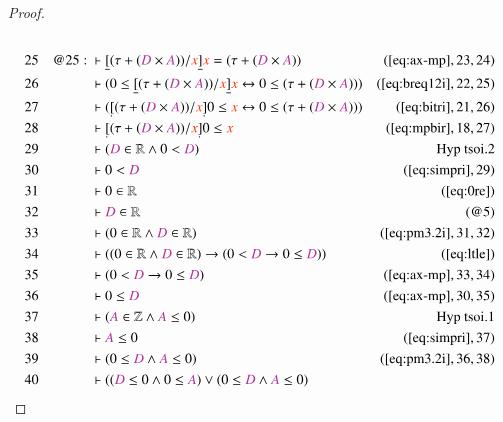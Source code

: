 \begin{proof}
\begin{align}
  \\ 25 && @25:\  & \vdash \underline{[} ( \tau + ( \mc{D} \times \mc{A} ) ) /
      \msc{x} \underline{]} \msc{x} = ( \tau + ( \mc{D}
      \times \mc{A} ) )&(\mbox{\ref{eq:ax-mp}},23,24)\notag
  \\ 26 &&  & \vdash ( 0 \le \underline{[} ( \tau + ( \mc{D} \times \mc{A} ) ) /
      \msc{x} \underline{]} \msc{x} \leftrightarrow 0 \le (
      \tau + ( \mc{D} \times \mc{A} ) )
      )&(\mbox{\ref{eq:breq12i}},22,25)\notag
  \\ 27 &&  & \vdash ( \underaccent{\dot}{[} ( \tau + ( \mc{D} \times \mc{A} ) )
      / \msc{x} \underaccent{\dot}{]} 0 \le \msc{x}
      \leftrightarrow 0 \le ( \tau + ( \mc{D} \times \mc{A}
      ) ) )&(\mbox{\ref{eq:bitri}},21,26)\notag
  \\ 28 &&  & \vdash \underaccent{\dot}{[} ( \tau + ( \mc{D} \times \mc{A} ) ) /
      \msc{x} \underaccent{\dot}{]} 0 \le
      \msc{x}&(\mbox{\ref{eq:mpbir}},18,27)\notag
  \\ 29 &&  & \vdash ( \mc{D} \in \mathbb{R} \wedge 0 < \mc{D}
      )&\text{Hyp~tsoi.2}\notag%
  \\ 30 &&  & \vdash 0 < \mc{D}&(\mbox{\ref{eq:simpri}},29)\notag
  \\ 31 &&  & \vdash 0 \in \mathbb{R}&(\mbox{\ref{eq:0re}})\notag
  \\ 32 &&  & \vdash \mc{D} \in \mathbb{R}&(@5)\notag
  \\ 33 &&  & \vdash ( 0 \in \mathbb{R} \wedge \mc{D} \in \mathbb{R}
      )&(\mbox{\ref{eq:pm3.2i}},31,32)\notag
  \\ 34 &&  & \vdash ( ( 0 \in \mathbb{R} \wedge \mc{D} \in \mathbb{R} )
      \rightarrow ( 0 < \mc{D} \rightarrow 0 \le \mc{D} )
      )&(\mbox{\ref{eq:ltle}})\notag
  \\ 35 &&  & \vdash ( 0 < \mc{D} \rightarrow 0 \le \mc{D}
      )&(\mbox{\ref{eq:ax-mp}},33,34)\notag
  \\ 36 &&  & \vdash 0 \le \mc{D}&(\mbox{\ref{eq:ax-mp}},30,35)\notag
  \\ 37 &&  & \vdash ( \mc{A} \in \mathbb{Z} \wedge \mc{A} \le 0
      )&\text{Hyp~tsoi.1}\notag%
  \\ 38 &&  & \vdash \mc{A} \le 0&(\mbox{\ref{eq:simpri}},37)\notag
  \\ 39 &&  & \vdash ( 0 \le \mc{D} \wedge \mc{A} \le 0
      )&(\mbox{\ref{eq:pm3.2i}},36,38)\notag
  \\ 40 &&  & \vdash ( ( \mc{D} \le 0 \wedge 0 \le \mc{A} ) \vee ( 0 \le \mc{D}
      \wedge \mc{A} \le 0 )

\end{align}
\end{proof}
